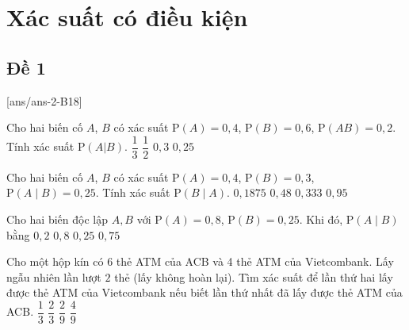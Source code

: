 \section{Xác suất có điều kiện}
\subsection{Đề 1}
[ans/ans-2-B18]
\caulc
\begin{ex}%
	Cho hai biến cố $A$, $B$ có xác suất $\mathrm{P}(A)=0{,}4$, $\mathrm{P}(B)=0{,}6$, $\mathrm{P}(AB)=0{,}2$. Tính xác suất $\mathrm{P}(A|B)$.
	\choice
	{\True$\dfrac{1}{3}$}
	{$\dfrac{1}{2}$}
	{$0{,}3$}
	{$0{,}25$}
\end{ex}

\begin{ex}%
	Cho hai biến cố $A$, $B$ có xác suất $\mathrm{P}(A)=0{,}4$, $\mathrm{P}(B)=0{,}3$, $\mathrm{P}(A\mid B)=0{,}25$. Tính xác suất $\mathrm{P}(B\mid A)$.
	\choice
	{\True $0{,}1875$}
	{$0{,}48$}
	{$0{,}333$}
	{$0{,}95$}
\end{ex}

\begin{ex}%
	Cho hai biến độc lập $A,B$ với $\mathrm{P}(A)=0{,}8$, $\mathrm{P}(B)=0{,}25$. Khi đó, $\mathrm{P}(A\mid B)$ bằng
	\choice
	{$0{,}2$}
	{\True $0{,}8$}
	{$0{,}25$}
	{$0{,}75$}
\end{ex}	

\begin{ex}%
	Cho một hộp kín có $6$ thẻ ATM của ACB và 4 thẻ ATM của Vietcombank. Lấy ngẫu nhiên lần lượt $2$ thẻ (lấy không hoàn lại). Tìm xác suất để lần thứ hai lấy được thẻ ATM của Vietcombank nếu biết lần thứ nhất đã lấy được thẻ ATM của ACB.
	\choice
	{ $\dfrac{1}{3}$}
	{$\dfrac{2}{3}$}
	{$\dfrac{2}{9}$}
	{\True$\dfrac{4}{9}$}
\end{ex}

